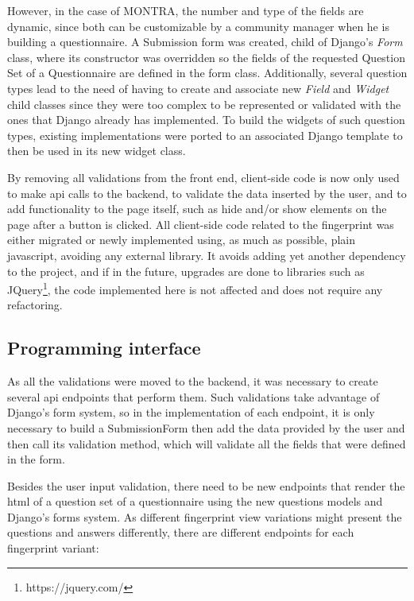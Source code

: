 However, in the case of MONTRA, the number and type of the fields are dynamic, since both can be customizable by a community manager when he is building a questionnaire.
A Submission form was created, child of Django's \textit{Form} class, where its constructor was overridden so the fields of the requested Question Set of a Questionnaire are defined in the form class.
Additionally, several question types lead to the need of having to create and associate new \textit{Field} and \textit{Widget} child classes since they were too complex to be represented or validated with the ones that Django already has implemented.
To build the widgets of such question types, existing implementations were ported to an associated Django template to then be used in its new widget class.

By removing all validations from the front end, client-side code is now only used to make \gls{api} calls to the backend, to validate the data inserted by the user, and to add functionality to the page itself, such as hide and/or show elements on the page after a button is clicked.
All client-side code related to the fingerprint was either migrated or newly implemented using, as much as possible, plain javascript, avoiding any external library.
It avoids adding yet another dependency to the project, and if in the future, upgrades are done to libraries such as JQuery\footnote{https://jquery.com/}, the code implemented here is not affected and does not require any refactoring.

\subsection{Programming interface}

As all the validations were moved to the backend, it was necessary to create several \gls{api} endpoints that perform them.
Such validations take advantage of Django's form system, so in the implementation of each endpoint, it is only necessary to build a SubmissionForm then add the data provided by the user and then call its validation method, which will validate all the fields that were defined in the form.

Besides the user input validation, there need to be new endpoints that render the \gls{html} of a question set of a questionnaire using the new questions models and Django's forms system.
As different fingerprint view variations might present the questions and answers differently, there are different endpoints for each fingerprint variant:

